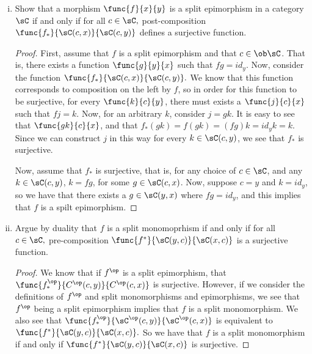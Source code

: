 \documentclass[main.tex]{subfiles}
\begin{document}
\begin{exercise}\leavevmode
	\begin{enumerate}[(i)]
	\item Show that a morphism \( \func{f}{x}{y} \) is a split epimorphism
		in a category \( \sC \) if and only if for all \( c\in \sC,\)
		post-composition \( \func{f_*}{\sC(c,x)}{\sC(c,y)} \) defines a
		surjective function.
	\begin{proof}
		 First, assume that \(f\) is a split epimorphism and that \(c \in
		 \ob\sC\). That is, there exists a function \(\func{g}{y}{x}\) such that
		 \(fg = id_y\). Now, consider the function
		 \(\func{f_*}{\sC(c,x)}{\sC(c,y)}.\) We know that this function
		 corresponds to composition on the left by \(f\), so in order for this
		 function to be surjective, for every \(\func{k}{c}{y}\), there must
		 exists a \(\func{j}{c}{x}\) such that \(fj = k\). Now, for an arbitrary
		 \(k\), consider \(j = gk\). It is easy to see that \(\func{gk}{c}{x}\),
		 and that \(f_*(gk) = f(gk) = (fg)k = id_yk = k\). Since we can construct
		 \(j\) in this way for every \(k \in \sC(c,y)\), we see that \(f_*\)
		 is surjective.

		Now, assume that \(f_*\) is surjective, that is, for any choice of \(c
		\in \sC\),  and any \(k \in \sC(c,y)\), \(k = fg\), for some \(g \in
		\sC(c,x)\). Now, suppose \(c = y\) and \(k = id_y\), so we have that
		there exists a \(g \in \sC(y,x)\) where \(fg = id_y\), and this implies
		that \(f\) is a spilt epimorphism.
	\end{proof}

	\item Argue by duality that \(f\) is a split monomoprhism if and
		only if for all \(c\in\sC,\) pre-composition
		\(\func{f^*}{\sC(y,c)}{\sC(x,c)}\) is a surjective function.
	\begin{proof}
		We know that if \(f^{\op}\) is a split epimorphism, that
		\(\func{f_{*}^{\op}}{C^{\op}(c,y)}{C^{\op}(c,x)}\) is surjective.
		However, if we consider the definitions of \(f^{\op}\) and split
		monomorphisms and epimorphisms, we see that \(f^{\op}\) being a split
		epimorphism implies that \(f\) is a split monomorphism. We also see that
		\(\func{f_{*}^{\op}}{\sC^{\op}(c,y)}{\sC^{\op}(c,x)}\) is equivalent to
		\(\func{f^{*}}{\sC(y,c)}{\sC(x,c)}.\) So we have that \(f\) is a split
		monomorphism if and only if \(\func{f^{*}}{\sC(y,c)}{\sC(x,c)}\) is
		surjective.
	\end{proof}
\end{enumerate}
\end{exercise}
\end{document}
